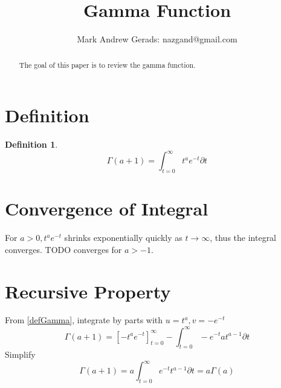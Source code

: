 \documentclass[]{article}
\author{Mark Andrew Gerads: nazgand@gmail.com}
\title{Gamma Function}
\newcommand{\pqty}[1]{{\left(#1\right)}}
\newcommand{\bqty}[1]{{\left[#1\right]}}
\newtheorem{definition}[theorem]{Definition}
\numberwithin{equation}{section}
\begin{document}
	
	\maketitle
	
	\begin{abstract}
		The goal of this paper is to review the gamma function.
	\end{abstract}
	
	\section{Definition}
	\begin{definition}
		\begin{equation}
		\label{defGamma}
		\Gamma\pqty{a+1}=\int_{t=0}^\infty t^a e^{-t} \partial t
		\end{equation}
	\end{definition}
	
	\section{Convergence of Integral}
	For \(a>0,t^a e^{-t}\) shrinks exponentially quickly as \(t\to\infty\), thus the integral converges. TODO converges for \(a>-1\).
	
	\section{Recursive Property}
	From \eqref{defGamma}, integrate by parts with \(u=t^a, v=-e^{-t}\)
	\begin{equation}
	\Gamma\pqty{a+1}=\bqty{-t^ae^{-t}}_{t=0}^\infty - 
	\int_{t=0}^\infty -e^{-t}at^{a-1} \partial t
	\end{equation}
	Simplify
	\begin{equation}
	\Gamma\pqty{a+1}= 
	a\int_{t=0}^\infty e^{-t}t^{a-1} \partial t= 
	a\Gamma\pqty{a}
	\end{equation}
\end{document}
